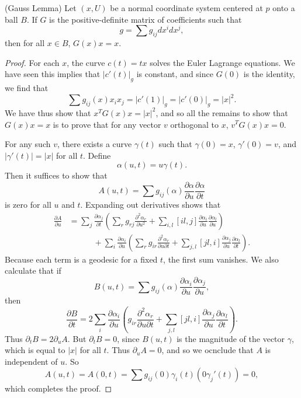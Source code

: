 \begin{lemma} (Gauss Lemma)
    Let $(x,U)$ be a normal coordinate system centered at $p$ onto a ball $B$. If $G$ is the positive-definite matrix of coefficients such that
    \[ g = \sum g_{ij} dx^i dx^j, \]
    then for all $x \in B$, $G(x) x = x$.
\end{lemma}
\begin{proof}   
    For each $x$, the curve $c(t) = t x$ solves the Euler Lagrange equations. We have seen this implies that $|c'(t)|_g$ is constant, and since $G(0)$ is the identity, we find that
    \[ \sum g_{ij}(x) x_i x_j = |c'(1)|_g = |c'(0)|_g = |x|^2. \]
    We have thus show that $x^T G(x) x = |x|^2$, and so all the remains to show that $G(x) x = x$ is to prove that for any vector $v$ orthogonal to $x$, $v^T G(x) x = 0$.

    For any such $v$, there exists a curve $\gamma(t)$ such that $\gamma(0) = x$, $\gamma'(0) = v$, and $|\gamma'(t)| = |x|$ for all $t$. Define
    \[ \alpha(u,t) = u \gamma(t). \]
    Then it suffices to show that
    \[ A(u,t) = \sum g_{ij}(\alpha) \frac{\partial \alpha}{\partial u} \frac{\partial \alpha}{\partial t} \]
    is zero for all $u$ and $t$. Expanding out derivatives shows that
    \begin{align*}
        \frac{\partial A}{\partial u} &= \sum_j \frac{\partial \alpha_j}{\partial t} \left( \sum_r g_{rj} \frac{\partial^2 \alpha_r}{\partial u^2} + \sum_{i,l} [il,j] \frac{\partial \alpha_i}{\partial u} \frac{\partial \alpha_l}{\partial u} \right)\\
        &\quad\quad\quad + \sum_i \frac{\partial \alpha_i}{\partial u} \left( \sum_r g_{ir} \frac{\partial^2 \alpha_r}{\partial u \partial t} + \sum_{j,l} [jl,i] \frac{\partial \alpha_j}{\partial u} \frac{\partial \alpha_l}{\partial t} \right).
    \end{align*}
    Because each term is a geodesic for a fixed $t$, the first sum vanishes. We also calculate that if
    \[ B(u,t) = \sum g_{ij}(\alpha) \frac{\partial \alpha_i}{\partial u} \frac{\partial \alpha_j}{\partial u}, \]
    then
    \[ \frac{\partial B}{\partial t} = 2 \sum_i \frac{\partial \alpha_i}{\partial u} \left( g_{ir} \frac{\partial^2 \alpha_r}{\partial u \partial t} + \sum_{j,l} [jl,i] \frac{\partial \alpha_j}{\partial u} \frac{\partial \alpha_l}{\partial t} \right). \]
    Thus $\partial_t B = 2 \partial_u A$. But $\partial_t B = 0$, since $B(u,t)$ is the magnitude of the vector $\gamma$, which is equal to $|x|$ for all $t$. Thus $\partial_u A = 0$, and so we ocnclude that $A$ is independent of $u$. So
    \[ A(u,t) = A(0,t) = \sum g_{ij}(0) \gamma_i(t) (0 \gamma_j'(t)) = 0, \]
    which completes the proof.
\end{proof}

